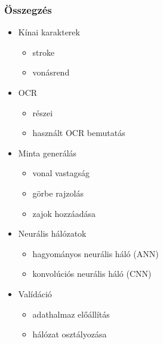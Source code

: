 \documentclass{beamer}
\begin{document}
\begin{frame}[fragile]
\frametitle{Összegzés}
\begin{itemize}
\item Kínai karakterek
	\begin{itemize}
	\item stroke
	\item vonásrend
	\end{itemize}
\item OCR
	\begin{itemize}
	\item részei
	\item használt OCR bemutatás
	\end{itemize}
\item Minta generálás
	\begin{itemize}
	\item vonal vastagság
	\item görbe rajzolás
	\item zajok hozzáadása
	\end{itemize}
\item Neurális hálózatok
	\begin{itemize}
	\item hagyományos neurális háló (ANN)
	\item konvolúciós neurális háló (CNN)
	\end{itemize}
\item Valídáció
	\begin{itemize}
	\item adathalmaz előállítás
	\item hálózat osztályozása
	\end{itemize}
\end{itemize}

\end{frame}
\end{document}

